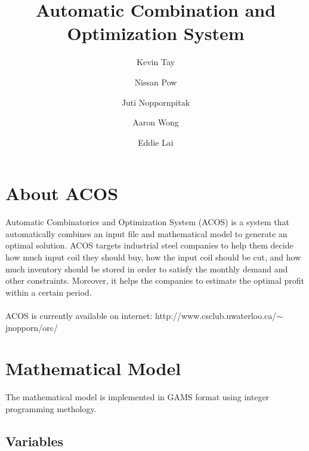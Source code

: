 \documentclass{article}[12pt]
\title{ \bfseries Automatic Combination and Optimization System}
\author{Kevin Tay \and Nissan Pow \and Juti Noppornpitak \and Aaron Wong \and Eddie Lai}
\begin{document}
\maketitle
%

\section{About ACOS}

Automatic Combinatorics and Optimization System (ACOS) is a system that automatically combines an input file and mathematical model to generate an optimal solution. ACOS targets industrial steel companies to help them decide how much input coil they should buy, how the input coil should be cut, and how much inventory should be stored in order to satisfy the monthly demand and other constraints. Moreover, it helps the companies to estimate the optimal profit within a certain period. \\ \\
ACOS is currently available on internet: http://www.csclub.uwaterloo.ca/$\sim$jnopporn/orc/ \\

\section{Mathematical Model} 
The mathematical model is implemented in GAMS format using integer programming methology.\\ 

\subsection{Variables} 
\end{document}
